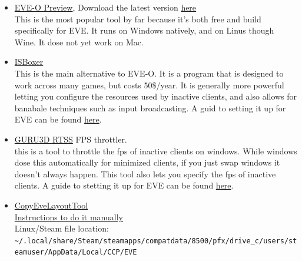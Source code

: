 \documentclass{article}
\begin{document}
\begin{itemize}
  \item \href{https://github.com/Proopai/eve-o-preview}{EVE-O Preview}, Download the latest version \href{https://github.com/Proopai/eve-o-preview/releases}{here} \\
        This is the most popular tool by far because it's both free and build specifically for EVE. It runs on Windows natively, and on Linus
        though Wine. It dose not yet work on Mac.
  \item \href{https://isboxer.com/}{ISBoxer} \\
        This is the main alternative to EVE-O. It is a program that is designed to work across many games, but costs 50\$/year. It
        is generally more powerful letting you configure the resources used by inactive clients, and also allows for banabale techniques
        such as input broadcasting. A guid to setting it up for EVE can be found \href{https://isboxer.com/wiki/EVE:Quick_Start_Guide}{here}.
  \item \href{https://www.guru3d.com/download/rtss-rivatuner-statistics-server-download}{GURU3D RTSS} FPS throttler.\\
        this is a tool to throttle the fps of inactive clients on windows. While windows dose this automatically for minimized clients, if you
        just swap windows it doesn't always happen. This tool also lets you specify the fps of inactive clients. A guide to stetting it up
        for EVE can be found \href{https://www.youtube.com/watch?v=R7YdEPDD_08}{here}.
  \item \href{https://github.com/kshannoninnes/CopyEveLayoutTool}{CopyEveLayoutTool} \\
        \href{https://forums.eveonline.com/t/manually-copy-settings-between-characters-and-accounts/32704}{Instructions to do it manually} \\
        Linux/Steam file location: \lstinline{~/.local/share/Steam/steamapps/compatdata/8500/pfx/drive_c/users/steamuser/AppData/Local/CCP/EVE} \\
\end{itemize}

\clearpage
\end{document}
